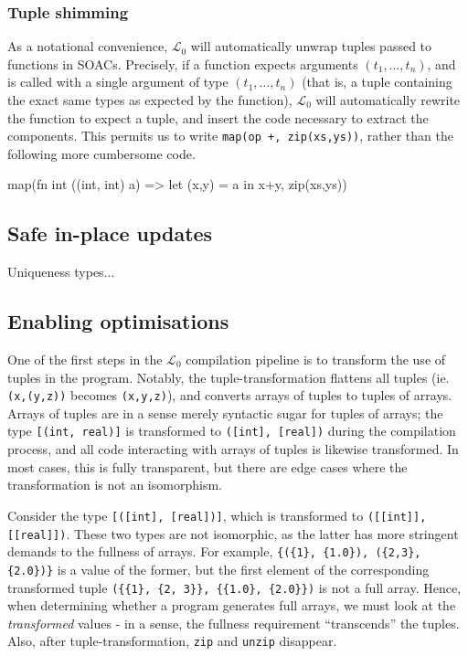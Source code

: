 \documentclass{sigplanconf}  %
\newcommand{\LO}{$\mathcal{L}_0$}
\begin{document}
\subsubsection{Tuple shimming}
\label{sec:shimming}

As a notational convenience, \LO{} will automatically unwrap tuples
passed to functions in SOACs.  Precisely, if a function expects
arguments $(t_{1},\ldots,t_{n})$, and is called with a single argument
of type $(t_{1},\ldots,t_{n})$ (that is, a tuple containing the exact
same types as expected by the function), \LO{} will automatically
rewrite the function to expect a tuple, and insert the code necessary
to extract the components.  This permits us to write {\tt map(op +,
  zip(xs,ys))}, rather than the following more cumbersome code.
\begin{colorcode}
  map(fn int ((int, int) a) => let (x,y) = a in x+y,
      zip(xs,ys))
\end{colorcode}

\subsection{Safe in-place updates}
\label{sec:in-place}

Uniqueness types...

\subsection{Enabling optimisations}
\label{sec:enabling-optimisations}
One of the first steps in the \LO{} compilation pipeline is to
transform the use of tuples in the program.  Notably, the
tuple-transformation flattens all tuples (ie. {\tt (x,(y,z))} becomes
{\tt (x,y,z)}), and converts arrays of tuples to tuples of arrays.
Arrays of tuples are in a sense merely syntactic sugar for tuples of
arrays; the type {\tt [(int, real)]} is transformed to {\tt ([int],
  [real])} during the compilation process, and all code interacting
with arrays of tuples is likewise transformed.  In most cases, this is
fully transparent, but there are edge cases where the transformation
is not an isomorphism.

Consider the type {\tt [([int], [real])]}, which is transformed to
{\tt([[int]], [[real]])}.  These two types are not isomorphic, as the
latter has more stringent demands to the fullness of arrays.  For
example, {\tt\{(\{1\}, \{1.0\}), (\{2,3\}, \{2.0\})\}} is a value of
the former, but the first element of the corresponding transformed
tuple {\tt(\{\{1\}, \{2, 3\}\}, \{\{1.0\}, \{2.0\}\})} is not a full
array.  Hence, when determining whether a program generates full
arrays, we must look at the \textit{transformed} values - in a sense,
the fullness requirement ``transcends'' the tuples.  Also, after
tuple-transformation, {\tt zip} and {\tt unzip} disappear.
\end{document}
